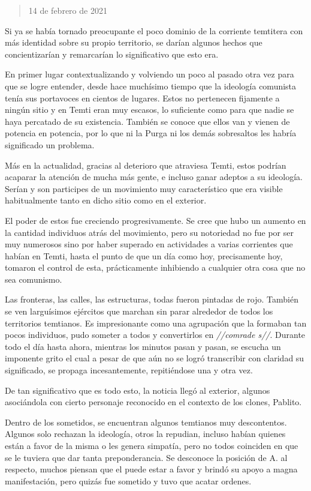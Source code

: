 \documentclass[
  spanish,
]{book}
\begin{document}
\begin{quote}
14 de febrero de 2021
\end{quote}

Si ya se había tornado preocupante el poco dominio de la corriente temtitera con más identidad sobre su propio territorio, se darían algunos hechos que concientizarían y remarcarían lo significativo que esto era.

En primer lugar contextualizando y volviendo un poco al pasado otra vez para que se logre entender, desde hace muchísimo tiempo que la ideología comunista tenía sus portavoces en cientos de lugares. Estos no pertenecen fijamente a ningún sitio y en Temti eran muy escasos, lo suficiente como para que nadie se haya percatado de su existencia. También se conoce que ellos van y vienen de potencia en potencia, por lo que ni la Purga ni los demás sobresaltos les habría significado un problema.

Más en la actualidad, gracias al deterioro que atraviesa Temti, estos podrían acaparar la atención de mucha más gente, e incluso ganar adeptos a su ideología. Serían y son participes de un movimiento muy característico que era visible habitualmente tanto en dicho sitio como en el exterior.

El poder de estos fue creciendo progresivamente. Se cree que hubo un aumento en la cantidad individuos atrás del movimiento, pero su notoriedad no fue por ser muy numerosos sino por haber superado en actividades a varias corrientes que habían en Temti, hasta el punto de que un día como hoy, precisamente hoy, tomaron el control de esta, prácticamente inhibiendo a cualquier otra cosa que no sea comunismo.

Las fronteras, las calles, las estructuras, todas fueron pintadas de rojo. También se ven larguísimos ejércitos que marchan sin parar alrededor de todos los territorios temtianos. Es impresionante como una agrupación que la formaban tan pocos individuos, pudo someter a todos y convertirlos en \emph{//comrade s//}. Durante todo el día hasta ahora, mientras los minutos pasan y pasan, se escucha un imponente grito el cual a pesar de que aún no se logró transcribir con claridad su significado, se propaga incesantemente, repitiéndose una y otra vez.

De tan significativo que es todo esto, la noticia llegó al exterior, algunos asociándola con cierto personaje reconocido en el contexto de los clones, Pablito.

Dentro de los sometidos, se encuentran algunos temtianos muy descontentos. Algunos solo rechazan la ideología, otros la repudian, incluso habían quienes están a favor de la misma o les genera simpatía, pero no todos coinciden en que se le tuviera que dar tanta preponderancia. Se desconoce la posición de A. al respecto, muchos piensan que el puede estar a favor y brindó su apoyo a magna manifestación, pero quizás fue sometido y tuvo que acatar ordenes.
\end{document}
